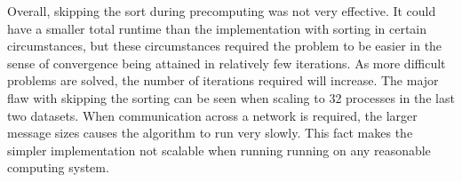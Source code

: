 \documentclass[a4paper]{article}
\begin{document}
Overall, skipping the sort during precomputing was not very effective. It could have a smaller total runtime than the implementation with sorting in
certain circumstances, but these circumstances required the problem to be easier in the sense of convergence being attained in relatively few
iterations. As more difficult problems are solved, the number of iterations required will increase. The major flaw with skipping the sorting can be
seen when scaling to 32 processes in the last two datasets. When communication across a network is required, the larger message sizes causes the
algorithm to run very slowly. This fact makes the simpler implementation not scalable when running running on any reasonable computing system.
\end{document}
